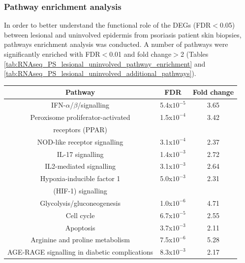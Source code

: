 \subsubsection{Pathway enrichment analysis}

In order to better understand the functional role of the DEGs (FDR$<$0.05) between lesional and uninvolved epidermis from psoriasis patient skin biopsies, pathways enrichment analysis was conducted. A number of pathways were significantly enriched with FDR$<$0.01 and fold change$>$2 (Tables \ref{tab:RNAseq_PS_lesional_uninvolved_pathway_enrichment} and \ref{tab:RNAseq_PS_lesional_uninvolved_additional_pathways}). 


\begin{table}[htbp]
\renewcommand{\arraystretch}{0.8}
\centering
\begin{tabular}{@{}c c c}
\toprule
\textbf{Pathway}                      & \textbf{FDR}           & \textbf{Fold change} \\
\midrule
\midrule
IFN-$\alpha$/$\beta$/signalling       &5.4x$10^{-5}$           &3.65                    \\
Peroxisome proliferator-activated     &1.5x$10^{-4}$           &3.42                    \\
receptors (PPAR) & &\\
NOD-like receptor signalling          &3.1x$10^{-4}$           &2.37                  \\
IL-17 signalling                      &1.4x$10^{-3}$           &2.72                    \\
IL2-mediated signalling               &3.1x$10^{-3}$           &2.64                    \\
Hypoxia-inducible factor 1            &5.0x$10^{-3}$           &2.31                     \\
(HIF-1) signalling & &\\
Glycolysis/gluconeogenesis            &1.0x$10^{-6}$           &4.71                     \\
Cell cycle                            &6.7x$10^{-5}$           &2.55                     \\
Apoptosis                             &3.7x$10^{-3}$           &2.11                      \\
Arginine and proline metabolism       &7.5x$10^{-6}$           &5.28                      \\
AGE-RAGE signalling in diabetic complications &8.3x$10^{-3}$  & 2.17 \\

\end{tabular}
\end{table}
